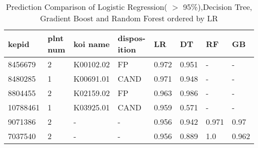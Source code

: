 \begin{table}[!htbp]
 \centering
 \caption{Prediction Comparison of Logistic Regression(  $>$ 95\%),Decision Tree, Gradient Boost and Random Forest ordered by LR}
 \label{dataLRDTGBRFcreftab} 
  \begin{tabular}
{| 
 p{}| 
 p{}| 
 p{}| 
 p{}| 
 p{}| 
 p{}| 
 p{}| 
 p{}| 
}\hline 
\textbf{kepid} &\textbf{plnt num} &\textbf{koi name} &\textbf{dispos-ition} &\textbf{LR} &\textbf{DT} &\textbf{RF} &\textbf{GB} \\ \hline 
8456679 &2 &K00102.02 &FP &0.972 &0.951 &- &- \\ \hline 
8480285 &1 &K00691.01 &CAND &0.971 &0.948 &- &- \\ \hline 
8804455 &2 &K02159.02 &FP &0.963 &0.986 &- &- \\ \hline 
10788461 &1 &K03925.01 &CAND &0.959 &0.571 &- &- \\ \hline 
9071386 &2 &- &- &0.956 &0.942 &0.971 &0.97 \\ \hline 
7037540 &2 &- &- &0.956 &0.889 &1.0 &0.962 \\ \hline 
\end{tabular} 
\end{table}